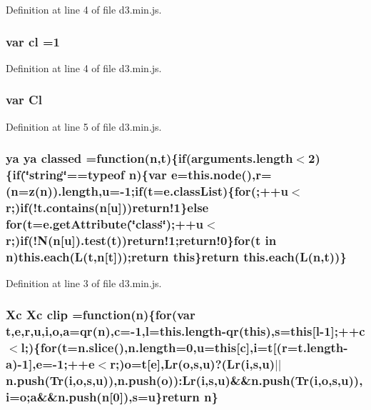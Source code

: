 Definition at line 4 of file d3.\+min.\+js.

\subsubsection[{cl}]{\setlength{\rightskip}{0pt plus 5cm}var cl =1}\label{d3_8min_8js_abe8b25953e85d4f434d4172e350bd714}


Definition at line 4 of file d3.\+min.\+js.

\subsubsection[{Cl}]{\setlength{\rightskip}{0pt plus 5cm}var Cl}\label{d3_8min_8js_a150a12a08b6297450402ce0153edf587}


Definition at line 5 of file d3.\+min.\+js.

\subsubsection[{classed}]{ {\bf ya} {\bf ya} classed =function({\bf n},t)\{{\bf if}(arguments.\+length$<$2)\{{\bf if}(\char`\"{}string\char`\"{}==typeof {\bf n})\{var {\bf e}={\bf this.\+node}(),{\bf r}=({\bf n}=z({\bf n})).length,u=-\/1;{\bf if}(t=e.\+class\+List)\{{\bf for}(;++u$<${\bf r};){\bf if}(!{\bf t.\+contains}({\bf n}[u]))return!1\}{\bf else} {\bf for}(t=e.\+get\+Attribute(\char`\"{}class\char`\"{});++u$<${\bf r};){\bf if}(!N({\bf n}[u]).test(t))return!1;return!0\}{\bf for}(t in {\bf n}){\bf this.\+each}(L(t,{\bf n}[t]));{\bf return} {\bf this}\}{\bf return} {\bf this.\+each}(L({\bf n},t))\}}\label{d3_8min_8js_a0f5a9fd9b6f6331a96d5b4493cacfd57}


Definition at line 3 of file d3.\+min.\+js.

\subsubsection[{clip}]{ {\bf Xc} {\bf Xc} clip =function({\bf n})\{{\bf for}(var t,{\bf e},{\bf r},u,{\bf i},{\bf o},{\bf a}={\bf qr}({\bf n}),{\bf c}=-\/1,l=this.\+length-\/{\bf qr}({\bf this}),s={\bf this}[l-\/1];++{\bf c}$<$l;)\{{\bf for}(t=n.\+slice(),n.\+length=0,u={\bf this}[{\bf c}],{\bf i}=t[({\bf r}=t.\+length-\/{\bf a})-\/1],{\bf e}=-\/1;++{\bf e}$<${\bf r};){\bf o}=t[{\bf e}],{\bf Lr}({\bf o},s,u)?({\bf Lr}({\bf i},s,u)$\vert$$\vert$n.\+push({\bf Tr}({\bf i},{\bf o},s,u)),n.\+push({\bf o}))\+:{\bf Lr}({\bf i},s,u)\&\&n.\+push({\bf Tr}({\bf i},{\bf o},s,u)),{\bf i}={\bf o};{\bf a}\&\&n.\+push({\bf n}[0]),s=u\}{\bf return} {\bf n}\}}\label{d3_8min_8js_aca7421c37eb89a5dd369e147673071d1}


